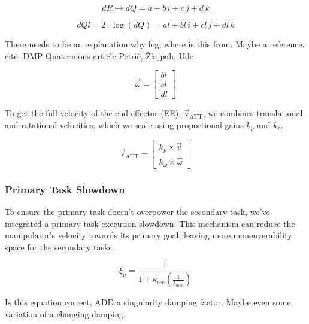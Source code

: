 \documentclass[]{article}
\begin{document}
\begin{equation}
	dR \mapsto dQ = a + b \, i + c \, j + d \, k
	\label{eq: quat_mapsto}
\end{equation}

\begin{equation}
	dQl = 2 \cdot \log(dQ) = al + bl \, i + cl \, j + dl \, k
	\label{eq:quat_log}
\end{equation}

\alert{There needs to be an explanation why log, where is this from. Maybe a reference. cite: DMP Quaternions article Petrič, Žlajpah, Ude}



\begin{equation}
	\vec{\omega} =
	\begin{bmatrix}
		bl \\
		cl \\
		dl
	\end{bmatrix}
	\label{eq:rot_error_vector}
\end{equation}

To get the full velocity of the end effector (EE), \( \mathrm{\vec{v}_{ATT}} \), we combines translational and rotational velocities, which we scale using proportional gains \( k_p \) and \( k_r \).

\begin{equation}
	\mathrm{\vec{v}_{ATT}} = 
	\begin{bmatrix}
		k_p \times \vec{v}   \\
		k_{\omega} \times \vec{\omega}
	\end{bmatrix}
	\label{eq:ee_velocity}
\end{equation}

\subsubsection{Primary Task Slowdown}
\label{chap:primary slowdown}

To ensure the primary task doesn't overpower the secondary task, we've integrated a primary task execution slowdown. This mechanism can reduce the manipulator's velocity towards its primary goal, leaving more maneuverability space for the secondary tasks.

\begin{equation}
	\label{eq:slowdown}
	\xi_{p}=
	\frac{1}{1 + \kappa_{\text{sec}} \left(\frac{1}{\delta_{min}}\right)}
\end{equation}

\alert{Is this equation correct, ADD a singularity damping factor. Maybe even some variation of a changing damping.}
\end{document}
